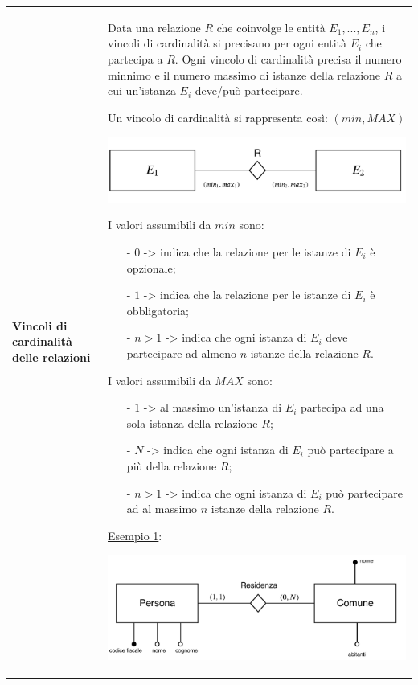 \documentclass[a4paper, 10pt]{report}
\begin{document}
\begin{longtable}{| p{} | p{} |}
\textbf{Vincoli di cardinalità delle relazioni} & Data una relazione $R$ che coinvolge le entità $E_1, ..., E_n$, i vincoli di cardinalità si precisano per ogni entità $E_i$ che partecipa a $R$. Ogni vincolo di cardinalità precisa il numero minnimo e il numero massimo di istanze della relazione $R$ a cui un'istanza $E_i$ deve/può partecipare.

Un vincolo di cardinalità si rappresenta così: $(min, MAX)$

\begin{center}
\includegraphics[scale=0.5]{img1.pdf}
\end{center}

I valori assumibili da $min$ sono:
\begin{itemize}
\item[-] $0$ -> indica che la relazione per le istanze di $E_i$ è opzionale;
\item[-] $1$ -> indica che la relazione per le istanze di $E_i$ è obbligatoria;
\item[-] $n > 1$ -> indica che ogni istanza di $E_i$ deve partecipare ad almeno $n$ istanze della relazione $R$.
\end{itemize}

I valori assumibili da $MAX$ sono:
\begin{itemize}
\item[-] $1$ -> al massimo un'istanza di $E_i$ partecipa ad una sola istanza della relazione $R$;
\item[-] $N$ -> indica che ogni istanza di $E_i$ può partecipare a più della relazione $R$;
\item[-] $n > 1$ -> indica che ogni istanza di $E_i$ può partecipare ad al massimo $n$ istanze della relazione $R$.
\end{itemize}

\underline{Esempio 1}:

\begin{center}
\includegraphics[scale=0.5]{img2.pdf}
\end{center}


\end{longtable}
\end{document}
